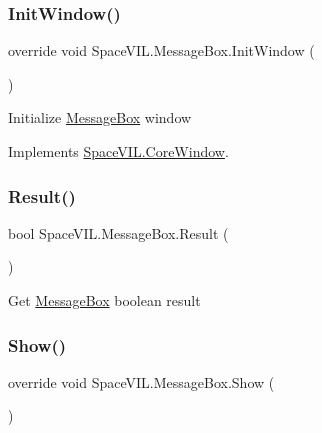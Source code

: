 \subsubsection{\texorpdfstring{Init\+Window()}{InitWindow()}}
{\footnotesize\ttfamily override void Space\+V\+I\+L.\+Message\+Box.\+Init\+Window (\begin{DoxyParamCaption}{ }\end{DoxyParamCaption})\hspace{0.3cm}{\ttfamily [virtual]}}



Initialize \mbox{\hyperlink{class_space_v_i_l_1_1_message_box}{Message\+Box}} window 



Implements \mbox{\hyperlink{class_space_v_i_l_1_1_core_window_aa3cf4ac54d9651b1149584dc81042824}{Space\+V\+I\+L.\+Core\+Window}}.

\mbox{\label{class_space_v_i_l_1_1_message_box_a9f0785f2987c4aa2aa1efb2c7323e3c2}} 
\subsubsection{\texorpdfstring{Result()}{Result()}}
{\footnotesize\ttfamily bool Space\+V\+I\+L.\+Message\+Box.\+Result (\begin{DoxyParamCaption}{ }\end{DoxyParamCaption})}



Get \mbox{\hyperlink{class_space_v_i_l_1_1_message_box}{Message\+Box}} boolean result 

\mbox{\label{class_space_v_i_l_1_1_message_box_a2d2963f79fd8eb73c03872eee52b4331}} 
\subsubsection{\texorpdfstring{Show()}{Show()}}
{\footnotesize\ttfamily override void Space\+V\+I\+L.\+Message\+Box.\+Show (\begin{DoxyParamCaption}{ }\end{DoxyParamCaption})\hspace{0.3cm}{\ttfamily [virtual]}}



